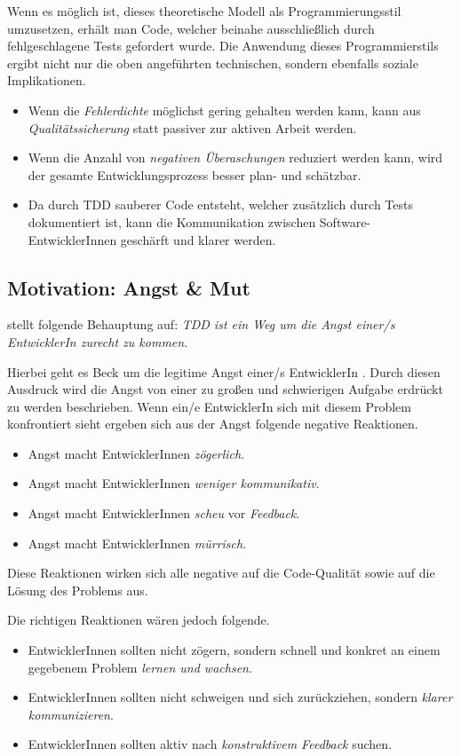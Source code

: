 Wenn es möglich ist, dieses theoretische Modell als Programmierungsstil umzusetzen, erhält man Code, welcher beinahe ausschließlich durch fehlgeschlagene Tests gefordert wurde. Die Anwendung dieses Programmierstils ergibt nicht nur die oben angeführten technischen, sondern ebenfalls soziale Implikationen.
\begin{itemize}
  \item Wenn die \textit{Fehlerdichte} möglichst gering gehalten werden kann, kann aus \textit{Qualitätssicherung} statt passiver zur aktiven Arbeit werden.
  \item Wenn die Anzahl von \textit{negativen Überaschungen} reduziert werden kann, wird der gesamte Entwicklungsprozess besser plan- und schätzbar.
  \item Da durch TDD sauberer Code entsteht, welcher zusätzlich durch Tests dokumentiert ist, kann die Kommunikation zwischen Software-EntwicklerInnen geschärft und klarer werden.
\end{itemize}
\subsection{Motivation: Angst {\&} Mut}
\cite{Beck:2003} stellt folgende Behauptung auf: \newline
\textit{TDD ist ein Weg um die Angst einer/s EntwicklerIn zurecht zu kommen}.

Hierbei geht es Beck um die legitime Angst einer/s EntwicklerIn . Durch diesen Ausdruck wird die Angst von einer zu großen und schwierigen Aufgabe erdrückt zu werden beschrieben.
Wenn ein/e EntwicklerIn sich mit diesem Problem konfrontiert sieht ergeben sich aus der Angst folgende negative Reaktionen.
\begin{itemize}
  \item Angst macht EntwicklerInnen \textit{zögerlich}.
  \item Angst macht EntwicklerInnen \textit{weniger kommunikativ}.
  \item Angst macht EntwicklerInnen \textit{scheu} vor \textit{Feedback}.
  \item Angst macht EntwicklerInnen \textit{mürrisch}.
\end{itemize}
Diese Reaktionen wirken sich alle negative auf die Code-Qualität sowie auf die Lösung des Problems aus.

Die richtigen Reaktionen wären jedoch folgende.
\begin{itemize}
  \item EntwicklerInnen sollten nicht zögern, sondern schnell und konkret an einem gegebenem Problem \textit{lernen und wachsen}.
  \item EntwicklerInnen sollten nicht schweigen und sich zurückziehen, sondern \textit{klarer kommunizieren}.
  \item EntwicklerInnen sollten aktiv nach \textit{konstruktivem Feedback} suchen.
\end{itemize}

